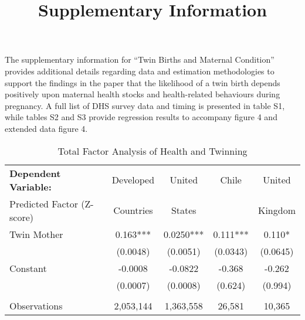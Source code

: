 \documentclass{nature}
\title{Supplementary Information}
\begin{document}
\maketitle

\begin{linenumbers}

The supplementary information for ``Twin Births and Maternal Condition'' provides additional details regarding data and estimation methodologies to support the findings in the paper that the likelihood of a twin birth depends positively upon maternal health stocks and health-related behaviours during pregnancy. A full list of DHS survey data and timing is presented in table S1, while tables S2 and S3 provide regression results to accompany figure 4 and extended data figure 4.



\clearpage
\begin{spacing}{1}

\begin{landscape}

\end{landscape}
\begin{landscape}

\end{landscape}


\begin{table}
  \begin{center}
    \caption{Total Factor Analysis of Health and Twinning}
    \begin{tabular}{lcccc}
      \toprule
\textbf{Dependent Variable:}       &Developed & United & Chile & United \\
 Predicted Factor (Z-score)        &Countries & States &       & Kingdom \\ \midrule
      Twin Mother&0.163***&0.0250***&0.111***&0.110*\\
      &(0.0048)&(0.0051)&(0.0343)&(0.0645)\\
      Constant&-0.0008&-0.0822&-0.368&-0.262 \\
  &(0.0007)&(0.0008)&(0.624)&(0.994) \\
      &&&&\\
  Observations&2,053,144&1,363,558&26,581&10,365 \\ \bottomrule
    \end{tabular}
  \end{center}
\end{table}



\end{spacing}
\end{linenumbers}
\end{document}
